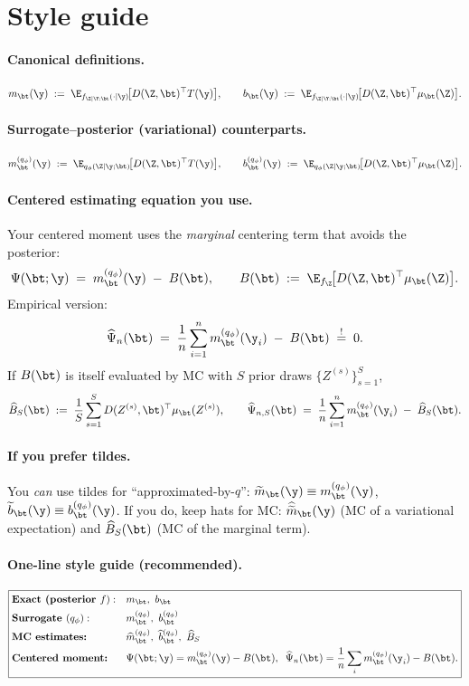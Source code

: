 \section{Style guide}


\paragraph{Canonical definitions.}
\[
m_\bt(\y)\;:=\;\E_{f_{\Z\mid\Y;\bt}(\cdot\mid \y)}\!\big[D(\Z,\bt)^\top T(\y)\big],
\qquad
b_\bt(\y)\;:=\;\E_{f_{\Z\mid\Y;\bt}(\cdot\mid \y)}\!\big[D(\Z,\bt)^\top \mu_\bt(\Z)\big].
\]

\paragraph{Surrogate–posterior (variational) counterparts.}
\[
m_\bt^{(q_\phi)}(\y)\;:=\;\E_{q_\phi(\Z\mid \y;\bt)}\!\big[D(\Z,\bt)^\top T(\y)\big],
\qquad
b_\bt^{(q_\phi)}(\y)\;:=\;\E_{q_\phi(\Z\mid \y;\bt)}\!\big[D(\Z,\bt)^\top \mu_\bt(\Z)\big].
\]

\paragraph{Centered estimating equation you use.}
Your centered moment uses the \emph{marginal} centering term that avoids the posterior:
\[
\Psi(\bt;\y)\;=\;m_\bt^{(q_\phi)}(\y)\;-\;B(\bt),
\qquad
B(\bt)\;:=\;\E_{f_\Z}\!\big[D(\Z,\bt)^\top \mu_\bt(\Z)\big].
\]
Empirical version:
\[
\widehat{\Psi}_n(\bt)\;=\;\frac{1}{n}\sum_{i=1}^n m_\bt^{(q_\phi)}(\y_i)\;-\;B(\bt)\;\overset{!}{=}\;0.
\]
If \(B(\bt)\) is itself evaluated by MC with \(S\) prior draws \(\{Z^{(s)}\}_{s=1}^S\),
\[
\widehat{B}_S(\bt)\;:=\;\frac{1}{S}\sum_{s=1}^S D(Z^{(s)},\bt)^\top \mu_\bt(Z^{(s)}),
\qquad
\widehat{\Psi}_{n,S}(\bt)\;=\;\frac{1}{n}\sum_{i=1}^n m_\bt^{(q_\phi)}(\y_i)\;-\;\widehat{B}_S(\bt).
\]

\paragraph{If you prefer tildes.}
You \emph{can} use tildes for “approximated-by-\(q\)”:
\(\widetilde{m}_\bt(\y)\equiv m_\bt^{(q_\phi)}(\y)\), \(\widetilde{b}_\bt(\y)\equiv b_\bt^{(q_\phi)}(\y)\).
If you do, keep hats for MC: \(\widehat{\widetilde{m}}_\bt(\y)\) (MC of a variational expectation) and \(\widehat{B}_S(\bt)\) (MC of the marginal term).

\paragraph{One-line style guide (recommended).}
\[
\boxed{
\begin{aligned}
&\textbf{Exact (posterior }f): && m_\bt,~ b_\bt \\
&\textbf{Surrogate }(q_\phi): && m_\bt^{(q_\phi)},~ b_\bt^{(q_\phi)} \\
&\textbf{MC estimates:} && \widehat{m}_\bt^{(q_\phi)},~ \widehat{b}_\bt^{(q_\phi)},~ \widehat{B}_S \\
&\textbf{Centered moment:} && \Psi(\bt;\y)=m_\bt^{(q_\phi)}(\y)-B(\bt),\;\;\widehat{\Psi}_n(\bt)=\frac1n\sum_i m_\bt^{(q_\phi)}(\y_i)-B(\bt).
\end{aligned}}
\]

